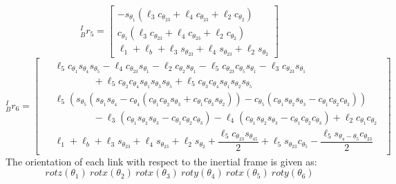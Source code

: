 \documentclass[12pt]{report}
\begin{document}
  \[
  ^I_Br_5 =
  \begin{bmatrix}
    -s_{\theta_1}(\ell_3c_{\theta_{23}} + \ell_4c_{\theta_{23}} + \ell_2c_{\theta_2}) \\
    c_{\theta_1}(\ell_3c_{\theta_{23}} + \ell_4c_{\theta_{23}} + \ell_2c_{\theta_2}) \\
    \ell_1 + \ell_b + \ell_3s_{\theta_{23}} + \ell_4s_{\theta_{23}} + \ell_2s_{\theta_2}
  \end{bmatrix}
  \]
  \[
  ^I_Br_6 =
  \begin{bmatrix}
  \begin{aligned}
      &\ell_5c_{\theta_1}s_{\theta_4}s_{\theta_5} - \ell_4c_{\theta_{23}}s_{\theta_1} - \ell_2c_{\theta_2}s_{\theta_1} - \ell_5c_{\theta_{23}}c_{\theta_5}s_{\theta_1} - \ell_3c_{\theta_{23}}s_{\theta_1} \\
      &\qquad\qquad+ \ell_5c_{\theta_2}c_{\theta_4}s_{\theta_1}s_{\theta_3}s_{\theta_5} + \ell_5c_{\theta_3}c_{\theta_4}s_{\theta_1}s_{\theta_2}s_{\theta_5} \\
      &\ell_5(s_{\theta_5}(s_{\theta_1}s_{\theta_4} - c_{\theta_4}(c_{\theta_1}c_{\theta_2}s_{\theta_3} + c_{\theta_1}c_{\theta_3}s_{\theta_2})) - c_{\theta_5}(c_{\theta_1}s_{\theta_2}s_{\theta_3} - c_{\theta_1}c_{\theta_2}c_{\theta_3})) \\
      &\qquad\qquad -\ell_3(c_{\theta_1}s_{\theta_2}s_{\theta_3} - c_{\theta_1}c_{\theta_2}c_{\theta_3}) -\ell_4(c_{\theta_1}s_{\theta_2}s_{\theta_3} - c_{\theta_1}c_{\theta_2}c_{\theta_3}) + \ell_2c_{\theta_1}c_{\theta_2} \\
      &\ell_1 + \ell_b + \ell_3s_{\theta_{23}} + \ell_4s_{\theta_{23}} + \ell_2s_{\theta_2} + \dfrac{\ell_5c_{\theta_{23}}s_{\theta_{45}}}{2} + \ell_5s_{\theta_{23}}c_{\theta_5} - \dfrac{\ell_5s_{\theta_4 - \theta_5}c_{\theta_{23}}}{2}
    \end{aligned}
  \end{bmatrix}
\]
\newpage
The orientation of each link with respect to the inertial frame is given as:
\[rotz(\theta_1)~rotx(\theta_2)~rotx(\theta_3)~roty(\theta_4)~rotx(\theta_5)~roty(\theta_6)\]
\end{document}
